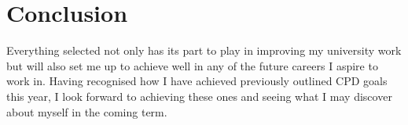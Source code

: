 \documentclass{scrartcl}
\begin{document}
\section{Conclusion}
Everything selected not only has its part to play in improving my university work but will also set me up to achieve well in any of the future careers I aspire to work in. Having recognised how I have achieved previously outlined CPD goals this year, I look forward to achieving these ones and seeing what I may discover about myself in the coming term. 

	
	
\end{document}
